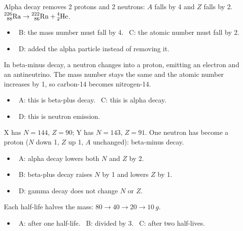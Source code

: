 \documentclass[12pt]{article}
\newcommand\nuc[3]{\ensuremath{\prescript{#1}{#2}{\mathrm{#3}}}}
\begin{document}
\begin{practiceanswers}
\begin{practiceans}
  Alpha decay removes 2 protons and 2 neutrons: $A$ falls by 4 and $Z$ falls by 2.
  $\nuc{226}{88}{Ra} \rightarrow \nuc{222}{86}{Rn} + \nuc{4}{2}{He}$.
  \begin{itemize}
    \item \xmark\ B: the mass number must fall by 4. \quad \xmark\ C: the atomic number must fall by 2.
    \item \xmark\ D: added the alpha particle instead of removing it.
  \end{itemize}
\end{practiceans}

\begin{practiceans}
  In beta-minus decay, a neutron changes into a proton, emitting an electron and an antineutrino. The
  mass number stays the same and the atomic number increases by 1, so carbon-14 becomes nitrogen-14.
  \begin{itemize}
    \item \xmark\ A: this is beta-plus decay. \quad \xmark\ C: this is alpha decay.
    \item \xmark\ D: this is neutron emission.
  \end{itemize}
\end{practiceans}

\begin{practiceans}
  X has $N = 144$, $Z = 90$; Y has $N = 143$, $Z = 91$. One neutron has become a proton ($N$ down 1,
  $Z$ up 1, $A$ unchanged): beta-minus decay.
  \begin{itemize}
    \item \xmark\ A: alpha decay lowers both $N$ and $Z$ by 2.
    \item \xmark\ B: beta-plus decay raises $N$ by 1 and lowers $Z$ by 1.
    \item \xmark\ D: gamma decay does not change $N$ or $Z$.
  \end{itemize}
\end{practiceans}

\begin{practiceans}
  Each half-life halves the mass: $80 \rightarrow 40 \rightarrow 20 \rightarrow \qty{10}{g}$.
  \begin{itemize}
    \item \xmark\ A: after one half-life. \quad \xmark\ B: divided by 3. \quad \xmark\ C: after two
          half-lives.
  \end{itemize}
\end{practiceans}


\end{practiceanswers}
\end{document}
